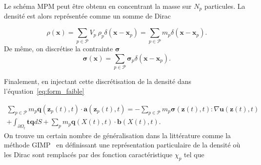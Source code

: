 
Le schéma MPM peut être obtenu en concentrant la masse sur $N_p$ particules. La densité est alors représentée comme un somme de Dirac

\begin{equation*}
    \rho(\bm x) = \sum_{p \in \mathcal P} V_p~\rho_p \delta(\bm x - \bm x_p) = \sum_{p \in \mathcal P} m_p \delta(\bm x - \bm x_p).
\end{equation*}De même, on discrétise la contrainte $\bm \sigma$
\begin{equation*}
    \bm \sigma(\bm x) = \sum_{p \in \mathcal P} \bm \sigma_p \delta(\bm x - \bm x_p).
\end{equation*}

Finalement, en injectant cette discrétisation de la densité dans l'équation~\eqref{eq:form_faible}

\begin{multline*}
    \sum_{p \in \mathcal P} m_p \bm q(\bm z_p(t), t)\cdot \bm a(\bm z_p(t), t) = - \sum_{p \in \mathcal P} m_p \bm \sigma(\bm z(t), t) : \nabla \bm u(\bm z(t), t) \\
    + \int_{\partial \Omega_t} \bm t \bm q dS + \sum_{p} m_p \bm q(X(t), t) \cdot \bm b(X(t), t).
\end{multline*}
On trouve un certain nombre de généralisation dans la littérature comme la méthode GIMP~\cite{bardenhagen_generalized_2004} en définissant une représentation particulaire de la densité où les Dirac sont remplacés par des fonction caractéristique $\chi_p$ tel que

